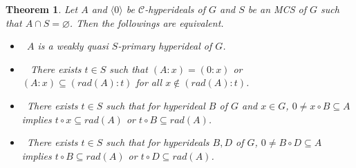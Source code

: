 \documentclass[preprint,review,10pt]{amsart}
\newtheorem{theorem}{Theorem}[section]
\theoremstyle{definition}
\theoremstyle{remark}
\numberwithin{equation}{section}
\begin{document}
\begin{theorem} \label{23}
Let $A$ and $\langle 0 \rangle$ be  $\mathcal{C}$-hyperideals of $G$ and  $S$ be an MCS of $G$ such that $A \cap S=\varnothing$. Then the followings are equivalent.
\begin{itemize}
\item[\rm{(i)}]~$A$ is a weakly quasi  $S$-primary hyperideal of $G$.
\item[\rm{(ii)}]~ There exists $t \in S$ such that $(A:x)=(0:x)$ or $(A:x) \subseteq (rad(A) : t)$ for all $x \notin (rad(A) : t)$. 
\item[\rm{(iii)}]~There exists $t \in S$ such that for hyperideal  $B$ of $G$ and $x \in G$, $0 \neq x \circ B \subseteq A$ implies $t \circ x \subseteq rad(A)$ or $t \circ B \subseteq rad(A)$. 
\item[\rm{(iv)}]~There exists $t \in S$ such that for hyperideals  $B,D$ of $G$, $0 \neq B \circ D \subseteq A$ implies  $t \circ B \subseteq rad(A)$ or $t \circ D \subseteq rad(A)$. 
\end{itemize}
\end{theorem}
\end{document}

